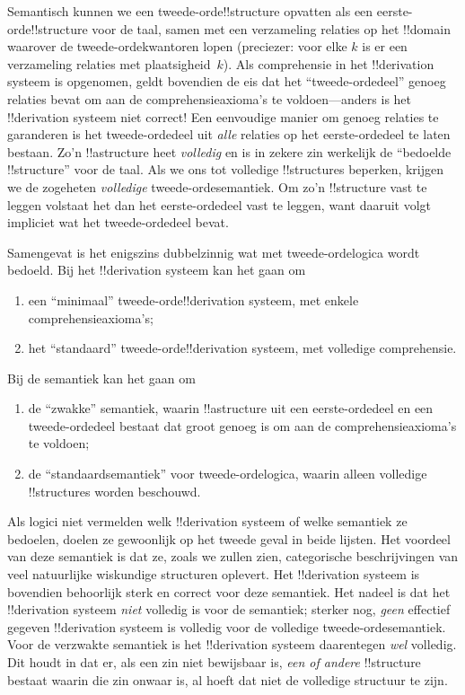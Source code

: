 \documentclass[openany]{memoir}
\begin{document}
Semantisch kunnen we een tweede-orde!!{structure} opvatten als een
eerste-orde!!{structure} voor de taal, samen met een verzameling relaties op
het !!{domain} waarover de tweede-ordekwantoren lopen (preciezer: voor elke
$k$ is er een verzameling relaties met plaatsigheid~$k$). Als comprehensie in
het !!{derivation} systeem is opgenomen, geldt bovendien de eis dat het
``tweede-ordedeel'' genoeg relaties bevat om aan de comprehensieaxioma's te
voldoen---anders is het !!{derivation} systeem niet correct!{} Een eenvoudige
manier om genoeg relaties te garanderen is het tweede-ordedeel uit
\emph{alle} relaties op het eerste-ordedeel te laten bestaan. Zo'n
!!a{structure} heet \emph{volledig} en is in zekere zin werkelijk de
``bedoelde !!{structure}'' voor de taal. Als we ons tot volledige
!!{structure}s beperken, krijgen we de zogeheten \emph{volledige}
tweede-ordesemantiek. Om zo'n !!{structure} vast te leggen volstaat het dan
het eerste-ordedeel vast te leggen, want daaruit volgt impliciet wat het
tweede-ordedeel bevat.

Samengevat is het enigszins dubbelzinnig wat met tweede-ordelogica wordt
bedoeld. Bij het !!{derivation} systeem kan het gaan om
\begin{enumerate}
\item een ``minimaal'' tweede-orde!!{derivation} systeem, met enkele
  comprehensieaxioma's;
\item het ``standaard'' tweede-orde!!{derivation} systeem, met volledige
  comprehensie.
\end{enumerate}
Bij de semantiek kan het gaan om
\begin{enumerate}
\item de ``zwakke'' semantiek, waarin !!a{structure} uit een eerste-ordedeel
  en een tweede-ordedeel bestaat dat groot genoeg is om aan de
  comprehensieaxioma's te voldoen;
\item de ``standaardsemantiek'' voor tweede-ordelogica, waarin alleen
  volledige !!{structure}s worden beschouwd.
\end{enumerate}
Als logici niet vermelden welk !!{derivation} systeem of welke semantiek ze
bedoelen, doelen ze gewoonlijk op het tweede geval in beide lijsten. Het
voordeel van deze semantiek is dat ze, zoals we zullen zien, categorische
beschrijvingen van veel natuurlijke wiskundige structuren oplevert. Het
!!{derivation} systeem is bovendien behoorlijk sterk en correct voor deze
semantiek. Het nadeel is dat het !!{derivation} systeem \emph{niet} volledig
is voor de semantiek; sterker nog, \emph{geen} effectief gegeven
!!{derivation} systeem is volledig voor de volledige tweede-ordesemantiek.
Voor de verzwakte semantiek is het !!{derivation} systeem daarentegen
\emph{wel} volledig. Dit houdt in dat er, als een zin niet bewijsbaar is,
\emph{een of andere} !!{structure} bestaat waarin die zin onwaar is, al hoeft
dat niet de volledige structuur te zijn.
\end{document}
